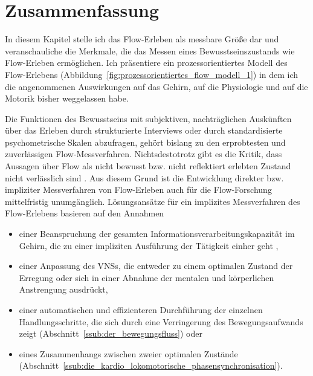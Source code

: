 

\section{Zusammenfassung} 

\label{sec:zusammenfassung_3}

In diesem Kapitel stelle ich das Flow-Erleben als messbare Größe dar und veranschauliche die Merkmale, die das Messen eines Bewusstseinszustands wie Flow-Erleben ermöglichen. Ich präsentiere ein prozessorientiertes Modell des Flow-Erlebens (Abbildung~\ref{fig:prozessorientiertes_flow_modell_1}) in dem ich die angenommenen Auswirkungen auf das Gehirn, auf die Physiologie und auf die Motorik bisher weggelassen habe. 

Die Funktionen des Bewusstseins mit subjektiven, nachträglichen Auskünften über das Erleben durch strukturierte Interviews oder durch standardisierte psychometrische Skalen abzufragen, gehört bislang zu den erprobtesten und zuverlässigen Flow-Messverfahren. Nichtsdestotrotz gibt es die Kritik, dass Aussagen über Flow als nicht bewusst bzw. nicht reflektiert erlebten Zustand nicht verlässlich sind \citep{Henk2014}. Aus diesem Grund ist die Entwicklung direkter bzw. impliziter Messverfahren von Flow-Erleben auch für die Flow-Forschung mittelfristig unumgänglich. Lösungsansätze für ein implizites Messverfahren des Flow-Erlebens basieren auf den Annahmen 
\begin{itemize}
	
	\item einer Beanspruchung der gesamten Informationsverarbeitungskapazität im Gehirn, die zu einer impliziten Ausführung der Tätigkeit einher geht \citep{Dietrich2004},
	
	\item einer Anpassung des \ac{VNS}s, die entweder zu einem optimalen Zustand der Erregung \citep{deManzano2010, Keller2011} oder sich in einer Abnahme der mentalen und körperlichen Anstrengung \citep{Peifer2014, Tozman2015, Harmat2015} ausdrückt,
	
	\item einer automatischen und effizienteren Durchführung der einzelnen Handlungsschritte, die sich durch eine Verringerung des Bewegungsaufwands zeigt (Abschnitt~\ref{ssub:der_bewegungsfluss}) oder 
	
	\item eines Zusammenhangs zwischen zweier optimalen Zustände (Abschnitt~\ref{ssub:die_kardio_lokomotorische_phasensynchronisation}). 
\end{itemize}

